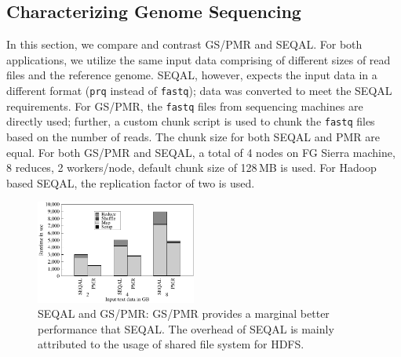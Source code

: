 \documentclass{acm_proc_article-sp}
\newcommand{\jhanote}[1]{ {\textcolor{red} { ***SJ: #1 }}}
\newcommand{\pnote}[1]{ {\textcolor{magenta} { ***pradeep: #1 }}}
\newcommand{\pnote}[1]{}
\newcommand{\jhanote}[1]{}
\newcommand{\upp}{\vspace*{-0.5em}}
\begin{document}
\upp\upp
\subsection{Characterizing Genome Sequencing}

In this section, we compare and contrast GS/PMR and SEQAL. For both
applications, we utilize the same input data comprising of different
sizes of read files and the reference genome. SEQAL, however, expects
the input data in a different format (\texttt{prq} instead of
\texttt{fastq}); data was converted to meet the SEQAL
requirements. For GS/PMR, the \texttt{fastq}
files from sequencing machines are directly used; further, a custom
chunk script is used to chunk the \texttt{fastq} files based on the number of
reads. The chunk size for both SEQAL and PMR are equal. For both
GS/PMR and SEQAL, a total of 4 nodes on FG Sierra machine, 8
reduces, 2 workers/node, default chunk size of 128\,MB is used. For
Hadoop based SEQAL, the replication factor of two is used.  


\begin{figure}[ht]
	\centering
		\includegraphics[width=0.47\textwidth]{figures/gs_seq_pmr.pdf}
\caption{SEQAL and GS/PMR: GS/PMR provides a marginal better
  performance that SEQAL. The overhead of SEQAL is mainly attributed
  to the usage of shared file system for HDFS.\upp}
\label{fig:gs_seq_pmr}
\end{figure}		
\end{document}
